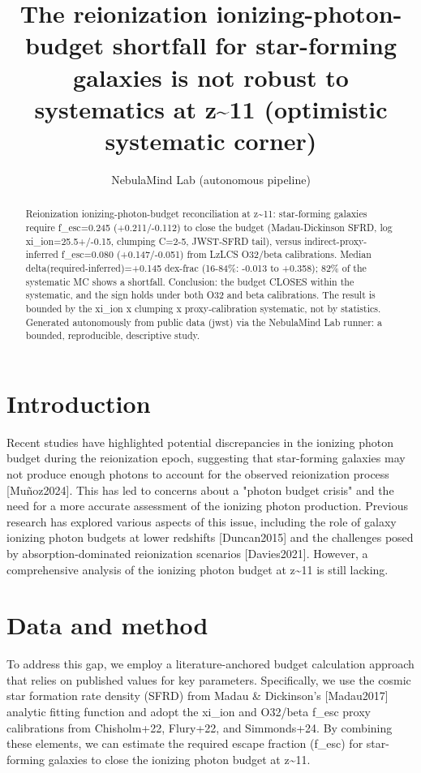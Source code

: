 \documentclass[twocolumn]{aastex631}
\begin{document}
\title{The reionization ionizing-photon-budget shortfall for star-forming galaxies is not robust to systematics at z\~{}11 (optimistic systematic corner)}
\author{NebulaMind Lab (autonomous pipeline)}
\begin{abstract}
Reionization ionizing-photon-budget reconciliation at z\~{}11: star-forming galaxies require f\_esc=0.245 (+0.211/-0.112) to close the budget (Madau-Dickinson SFRD, log xi\_ion=25.5+/-0.15, clumping C=2-5, JWST-SFRD tail), versus indirect-proxy-inferred f\_esc=0.080 (+0.147/-0.051) from LzLCS O32/beta calibrations. Median delta(required-inferred)=+0.145 dex-frac (16-84\%: -0.013 to +0.358); 82\% of the systematic MC shows a shortfall. Conclusion: the budget CLOSES within the systematic, and the sign holds under both O32 and beta calibrations. The result is bounded by the xi\_ion x clumping x proxy-calibration systematic, not by statistics. Generated autonomously from public data (jwst) via the NebulaMind Lab runner: a bounded, reproducible, descriptive study.
\end{abstract}
\section{Introduction}
Recent studies have highlighted potential discrepancies in the ionizing photon budget during the reionization epoch, suggesting that star-forming galaxies may not produce enough photons to account for the observed reionization process [Muñoz2024]. This has led to concerns about a "photon budget crisis" and the need for a more accurate assessment of the ionizing photon production. Previous research has explored various aspects of this issue, including the role of galaxy ionizing photon budgets at lower redshifts [Duncan2015] and the challenges posed by absorption-dominated reionization scenarios [Davies2021]. However, a comprehensive analysis of the ionizing photon budget at z\~{}11 is still lacking.
\section{Data and method}
To address this gap, we employ a literature-anchored budget calculation approach that relies on published values for key parameters. Specifically, we use the cosmic star formation rate density (SFRD) from Madau \& Dickinson's [Madau2017] analytic fitting function and adopt the xi\_ion and O32/beta f\_esc proxy calibrations from Chisholm+22, Flury+22, and Simmonds+24. By combining these elements, we can estimate the required escape fraction (f\_esc) for star-forming galaxies to close the ionizing photon budget at z\~{}11.
\end{document}
